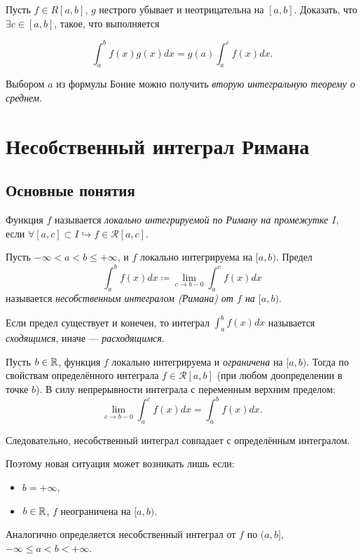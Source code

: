 \begin{problem}
    Пусть $f \in R[a, b]$, $g$ нестрого убывает и неотрицательна на $[a, b]$. Доказать, что $\exists c \in [a, b]$, такое, что выполняется

    \[
        \int_a^b f(x) g(x) dx = g(a) \int_a^c f(x) dx.
    \]
\end{problem}

Выбором $a$ из формулы Бонне можно получить \emph{вторую интегральную теорему о среднем}.

\section{Несобственный интеграл Римана}
\subsection{Основные понятия}

\begin{definition}
    Функция $f$ называется \emph{локально интегрируемой по Риману на промежутке $I$}, если $\forall [a, c] \subset I \hookrightarrow f \in \mathcal{R}[a, c]$.

\end{definition}

\begin{definition}
    Пусть $-\infty < a < b \le +\infty$, и $f$ локально интегрируема на $[a, b)$. Предел
    \[
        \int_a^b f(x) dx \coloneqq \lim_{c \rightarrow b-0} \int_a^c f(x) dx
    \]
    называется \emph{несобственным интегралом (Римана) от $f$ на $[a, b)$}.

    Если предел существует и конечен, то интеграл $\int_a^b f(x) dx$ называется \emph{сходящимся}, иначе --- \emph{расходящимся}.
\end{definition}

\begin{note}
    Пусть $b \in \mathbb{R}$, функция $f$ локально интегрируема и \emph{ограничена} на $[a, b)$. Тогда по свойствам определённого интеграла $f \in \mathcal{R}[a, b]$ (при любом доопределении в точке $b$). В силу непрерывности интеграла с переменным верхним пределом:
    \[
        \lim_{c \rightarrow b - 0} \int_a^c f(x) dx = \int_a^b f(x) dx.
    \]

    Следовательно, несобственный интеграл совпадает с определённым интегралом.

    Поэтому новая ситуация может возникать лишь если:
    \begin{itemize}
        \item $b = +\infty$,
        \item $b \in \mathbb{R}$, $f$ неограничена на $[a, b)$.
    \end{itemize}

    Аналогично определяется несобственный интеграл от $f$ по $(a, b]$, $-\infty \le a < b < +\infty$.
\end{note}

